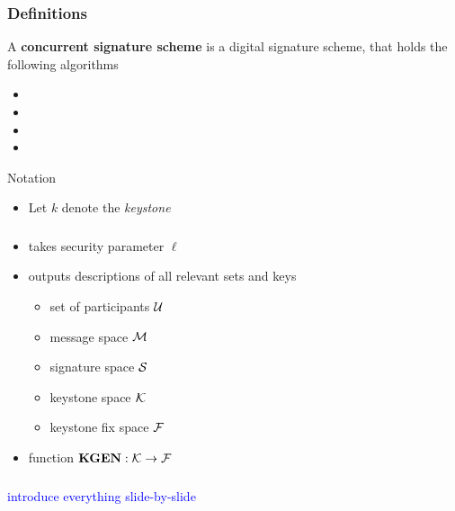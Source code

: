 \begin{frame}
	\frametitle{Definitions}

	\begin{definition}
		A \textbf{concurrent signature scheme} is a digital signature scheme, that holds the following algorithms
		\begin{itemize}
			\item \setup
			\item \asign
			\item \averify
			\item \verify
		\end{itemize}
	\end{definition}

	\begin{block}{Notation}
		\begin{itemize}
			\item Let $k$ denote the \textit{keystone}
		\end{itemize}
	\end{block}
\end{frame}

\begin{frame}
	\frametitle{\setup}

	\begin{itemize}
		\item takes security parameter $\ell$
		\item outputs descriptions of all relevant sets and keys
			\begin{itemize}
				\item set of participants $\mathcal{U}$
				\item message space $\mathcal{M}$
				\item signature space $\mathcal{S}$
				\item keystone space $\mathcal{K}$
				\item keystone fix space $\mathcal{F}$
			\end{itemize}
		\item function $\textbf{KGEN}: \mathcal{K} \to \mathcal{F}$
	\end{itemize}
\end{frame}

\begin{frame}
	\frametitle{\asign}

	\begin{center}	
	\end{center}

	\textcolor{blue}{\small introduce everything slide-by-slide}
\end{frame}

